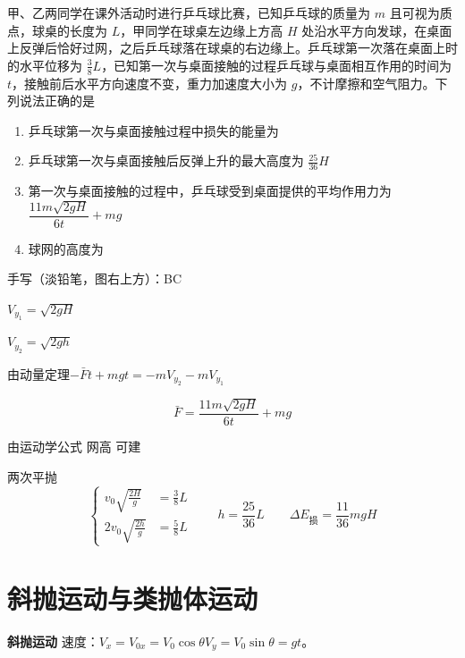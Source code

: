\begin{problem}
甲、乙两同学在课外活动时进行乒乓球比赛，已知乒乓球的质量为 $m$ 且可视为质点，球桌的长度为 $L$，甲同学在球桌左边缘上方高 $H$ 处沿水平方向发球，在桌面上反弹后恰好过网，之后乒乓球落在球桌的右边缘上。乒乓球第一次落在桌面上时的水平位移为 $\frac{3}{8}L$，已知第一次与桌面接触的过程乒乓球与桌面相互作用的时间为 $t$，接触前后水平方向速度不变，重力加速度大小为 $g$，不计摩擦和空气阻力。下列说法正确的是
\begin{enumerate}[label=\Alph*.,leftmargin=2em,itemsep=0pt]
\item 乒乓球第一次与桌面接触过程中损失的能量为  %
\item 乒乓球第一次与桌面接触后反弹上升的最大高度为 $\frac{25}{36}H$
\item 第一次与桌面接触的过程中，乒乓球受到桌面提供的平均作用力为 $\dfrac{11m\sqrt{2gH}}{6t}+mg$
\item 球网的高度为  %
\end{enumerate}
手写（淡铅笔，图右上方）：BC
\begin{solution}
$V_{y_1}=\sqrt{2gH}$

$V_{y_2}=\sqrt{2gh}$

由动量定理\quad $-\bar{F}t+mgt=-mV_{y_2}-mV_{y_1}$

\[
\bar{F}=\frac{11m\sqrt{2gH}}{6t}+mg
\]

由运动学公式 网高 可建

两次平抛
\[
\left\{\begin{aligned}
v_0\sqrt{\frac{2H}{g}}&=\frac{3}{8}L\\
2v_0\sqrt{\frac{2h}{g}}&=\frac{5}{8}L
\end{aligned}\right.
\qquad h=\frac{25}{36}L\qquad \Delta E_{\text{损}}=\frac{11}{36}mgH
\]
\end{solution}
\end{problem}


\section{斜抛运动与类抛体运动}
\textbf{斜抛运动}
速度：$V_x=V_{0x}=V_0\cos\theta$\qquad $V_y=V_0\sin\theta=gt$。 %

